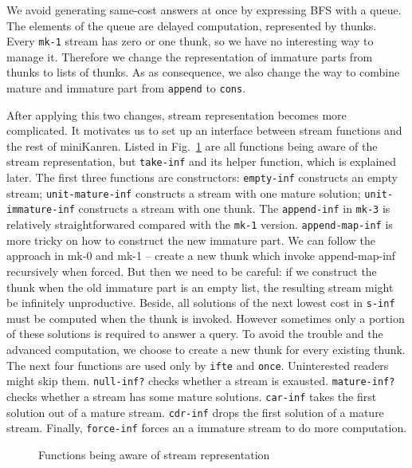 \documentclass[format=acmlarge, review=true, authordraft=true]{acmart}
\begin{document}
We avoid generating same-cost answers at once by expressing BFS with a queue. 
The elements of the queue are delayed computation, represented by thunks. Every 
\texttt{mk-1} stream has zero or one thunk, so we have no interesting way to 
manage it. Therefore we change the representation of immature parts from thunks 
to lists of thunks. As as consequence, we also change the way to combine mature 
and immature part from \texttt{append} to \texttt{cons}. 

After applying this two changes, stream representation becomes more 
complicated. It motivates us to set up an interface between stream functions 
and the rest of miniKanren. Listed in Fig.~\ref{interface} are all functions 
being aware of the stream representation, but \texttt{take-inf} and its helper 
function, which is explained later. The first three functions are constructors: 
\texttt{empty-inf} constructs an empty stream; \texttt{unit-mature-inf} 
constructs a stream with one mature solution; \texttt{unit-immature-inf} 
constructs a stream with one thunk. The \texttt{append-inf} in \texttt{mk-3} is 
relatively straightforwared compared with the \texttt{mk-1} version. 
\texttt{append-map-inf} is more tricky on how to construct the new immature 
part. We can follow the approach in mk-0 and mk-1 -- create a new thunk which 
invoke append-map-inf recursively when forced. But then we need to be careful: 
if we construct the thunk when the old immature part is an empty list, the 
resulting stream might be infinitely unproductive. Beside, all solutions of the 
next lowest cost in \texttt{s-inf} must be computed when the thunk is invoked. 
However sometimes only a portion of these solutions is required to answer a 
query. To avoid the trouble and the advanced computation, we choose to create a 
new thunk for every existing thunk. The next four functions are used only by 
\texttt{ifte} and \texttt{once}. Uninterested readers might skip them. 
\texttt{null-inf?} checks whether a stream is exausted. \texttt{mature-inf?} 
checks whether a stream has some mature solutions. \texttt{car-inf} takes the 
first solution out of a mature stream. \texttt{cdr-inf} drops the first 
solution of a mature stream. Finally, \texttt{force-inf} forces an a immature 
stream to do more computation.

\begin{figure}
	 	
	 \caption{Functions being aware of stream representation}
	 \label{interface}
\end{figure}
\end{document}

